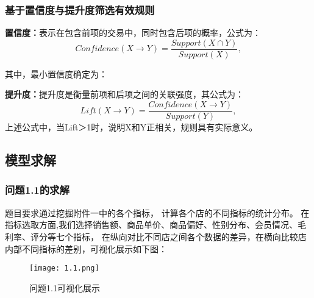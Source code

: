 \documentclass[withoutpreface,bwprint]{cumcmthesis}
\begin{document}
\subsubsection{基于置信度与提升度筛选有效规则}
\par
\textbf{置信度：}表示在包含前项的交易中，同时包含后项的概率，公式为：
\begin{equation}
\label{eq:公式1}
Confidence(X→Y) = \frac{Support(X\cap Y)}{Support(X)},
\end{equation}

其中，最小置信度确定为：

\par
\textbf{提升度：}提升度是衡量前项和后项之间的关联强度，其公式为：
\begin{equation}
\label{eq:公式1}
Lift(X→Y) = \frac{Confidence(X→Y)}{Support(Y)},
\end{equation}
上述公式中，当Lift＞1时，说明X和Y正相关，规则具有实际意义。



\subsection{模型求解}

\subsubsection {问题1.1的求解}
\par
题目要求通过挖掘附件一中的各个指标，
计算各个店的不同指标的统计分布。
在指标选取方面,我们选择销售额、商品单价、商品偏好、性别分布、会员情况、毛利率、评分等七个指标，
在纵向对比不同店之间各个数据的差异，在横向比较店内部不同指标的差别，可视化展示如下图：
\begin{figure}[H]
\centering
\texttt{[image: 1.1.png]}
\caption{问题1.1可视化展示}
\label{fig:单图}
\end{figure}

\par 
\end{document}
